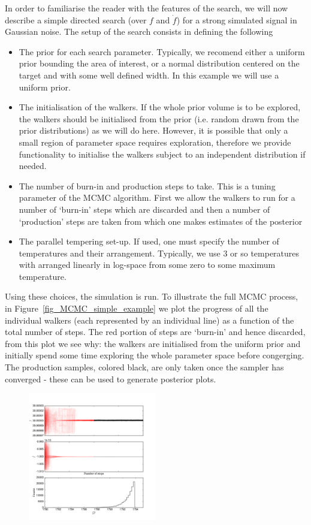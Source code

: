 \documentclass[aps, prd, twocolumn, superscriptaddress, floatfix, showpacs, nofootinbib, longbibliography]{revtex4-1}
\begin{document}
In order to familiarise the reader with the features of the search, we will now
describe a simple directed search (over $f$ and $\dot{f}$) for a strong
simulated signal in Gaussian noise. The setup of the search consists in defining
the following
\begin{itemize}
\item The prior for each search parameter. Typically, we recomend either a uniform
prior bounding the area of interest, or a normal distribution centered on the
target and with some well defined width. In this example we will use a uniform
prior.
\item The initialisation of the walkers. If the whole prior volume is to be explored,
the walkers should be initialised from the prior (i.e. random drawn from the
prior distributions) as we will do here. However, it is possible that only a
small region of parameter space requires exploration, therefore we provide
functionality to initialise the walkers subject to an independent distribution
if needed.
\item The number of burn-in and production steps to take. This is a tuning
parameter of the MCMC algorithm. First we allow the walkers to run for a number
of `burn-in' steps which are discarded and then a number of `production' steps
are taken from which one makes estimates of the posterior
\item The parallel tempering set-up. If used, one must specify the number of
temperatures and their arrangement. Typically, we use 3 or so temperatures
with arranged linearly in log-space from some zero to some maximum temperature.
\end{itemize}

Using these choices, the simulation is run. To illustrate the full MCMC process,
in Figure~\ref{fig_MCMC_simple_example} we plot the progress of all the individual
walkers (each represented by an individual line) as a function of the total
number of steps. The red portion of steps are `burn-in' and hence discarded,
from this plot we see why: the walkers are initialised from the uniform prior
and initially spend some time exploring the whole parameter space before congerging.
The production samples, colored black, are only taken once the sampler has
converged - these can be used to generate posterior plots.

\begin{figure}[htb]
\centering
\includegraphics[width=0.5\textwidth]{fully_coherent_search_using_MCMC_walkers}
\caption{}
\label{fig:}
\end{figure}
\end{document}
